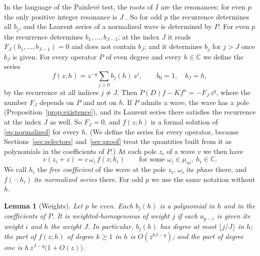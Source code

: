 \documentclass[11pt]{article}
\newtheorem{lemma}[theorem]{Lemma}
\theoremstyle{definition}
\theoremstyle{remark}
\numberwithin{equation}{section}
\newcommand{\CC}{\mathbb C}
\begin{document}
In the language of the Painlev\'e test, the roots of \(I\) are the
resonances; for even \(p\) the only positive integer resonance is \(J\)
\citep{Wu2014}. So for odd \(p\) the
recurrence determines all \(b_j\), and the Laurent series of a
normalized wave is determined by \(P\). For even \(p\) the recurrence determines
\(b_1,\dots,b_{J-1}\); at the index \(J\) it reads
\(F_J(b_1,\dots,b_{J-1})=0\) and does not contain \(b_J\); and it
determines \(b_j\) for \(j>J\) once \(b_J\) is given. For every
operator \(P\) of even degree and every \(h\in\CC\) we define the
series
\begin{equation}\label{eq:family}
 f(z;h)=z^{-q}\sum_{j\ge0}b_j(h)\,z^j,\qquad b_0=1,\quad b_J=h,
\end{equation}
by the recurrence at all indices \(j\ne J\). Then
\(P(D)f-Kf^n=-F_J\,z^{q}\), where the number \(F_J\) depends on \(P\)
and not on \(h\). If \(P\) admits a wave, the wave has a pole
(Proposition~\ref{prop:existence}), and its Laurent series there
satisfies the recurrence at the index \(J\) as well. So \(F_J=0\), and
\(f(z;h)\) is a formal solution of \eqref{eq:normalized} for every
\(h\). (We define the series for every operator, because
Sections~\ref{sec:selectors} and~\ref{sec:proof} treat the quantities
built from it as polynomials in the coefficients of \(P\).) At each
pole \(z_i\) of a wave \(v\) we then have
\begin{equation}\label{eq:pole-germs}
 v(z_i+z)=c\,\omega_i\,f(z;h_i)\qquad
 \text{for some }\omega_i\in\mu_m,\ h_i\in\CC.
\end{equation}
We call \(h_i\) the \emph{free coefficient} of the wave at the pole
\(z_i\), \(\omega_i\) its \emph{phase} there, and \(f(\cdot\,;h_i)\) its
\emph{normalized series} there. For
odd \(p\) we use the same notation without \(h\).

\begin{lemma}[Weights]\label{lem:degree}
Let \(p\) be even. Each \(b_j(h)\) is a polynomial in \(h\) and in the
coefficients of \(P\). It is weighted-homogeneous of weight \(j\) if
each \(a_{p-i}\) is given its weight \(i\) and \(h\) the weight \(J\). In
particular, \(b_j(h)\) has degree at most \(\lfloor j/J\rfloor\) in
\(h\); the part of \(f(z;h)\) of degree \(k\ge1\) in \(h\) is
\(O(z^{kJ-q})\); and the part of degree one is
\(h\,z^{J-q}\bigl(1+O(z)\bigr)\).
\end{lemma}
\end{document}
